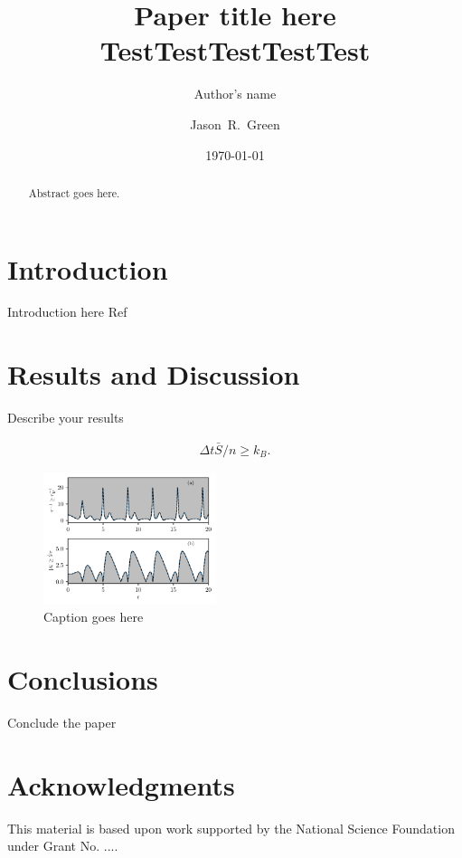 \documentclass[prl,aps,reprint,noshowpacs,superscriptaddress,floatfix,letterpaper,longbibliography]{revtex4-2}
\begin{document}
	
	\title{Paper title here TestTestTestTestTest}  
	
	\author{Author's name}
	\author{Jason~R.~Green}
	\date{\today}
	
\begin{abstract}	
	Abstract goes here.
	\lipsum[1-1]
\end{abstract}

\maketitle

\section{Introduction}
Introduction here Ref~\cite{Nicholson2020}

\lipsum[2-3]

\section{Results and Discussion}
Describe your results

\begin{align}
\Delta t \bar S/n\geq k_B.
\end{align}

\lipsum[2-3]
\begin{figure}[h!]
	\centering
	\hspace*{-0.75cm}\includegraphics[width=0.45\textwidth]{sample-plot.pdf}
	\caption{Caption goes here}
	\label{fig:plot-label}
\end{figure}


\section{Conclusions}

Conclude the paper

\lipsum[2-3]

\section{Acknowledgments}
\begin{acknowledgments}
This material is based upon work supported by the National Science Foundation under Grant No. ....

\end{acknowledgments}
\appendix


\end{document}
